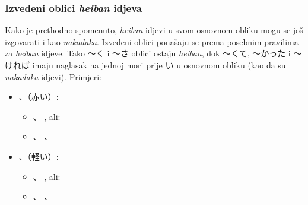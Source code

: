 \subsubsection*{Izvedeni oblici \textit{heiban} idjeva}
Kako je prethodno spomenuto, \textit{heiban} idjevi u svom osnovnom obliku mogu se još izgovarati i kao \textit{nakadaka}.
Izvedeni oblici ponašaju se prema posebnim pravilima za \textit{heiban} idjeve.
Tako 〜く i 〜さ oblici ostaju \textit{heiban}, dok 〜くて, 〜かった i 〜ければ imaju naglasak na jednoj mori prije い u osnovnom obliku (kao da su \textit{nakadaka} idjevi).
Primjeri:
\begin{itemize}
	\item {}、（赤い）: 
	\begin{itemize}
		\item {}、
		, ali:
		\item {}、	
		、
	\end{itemize}
	\item {}、（軽い）: 
	\begin{itemize}
		\item {}、
		, ali:
		\item {}、
		、
	\end{itemize}
\end{itemize}
